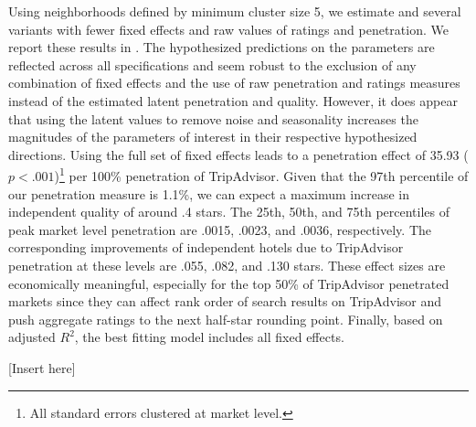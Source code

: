 \documentclass[12pt, leqno]{article}
\begin{document}
Using neighborhoods defined by minimum cluster size 5, we estimate  and several variants with fewer fixed effects and raw values of ratings and penetration. We report these results in . The hypothesized predictions on the parameters are reflected across all specifications and seem robust to the exclusion of any combination of fixed effects and the use of raw penetration and ratings measures instead of the estimated latent penetration and quality. However, it does appear that using the latent values to remove noise and seasonality increases the magnitudes of the parameters of interest in their respective hypothesized directions. Using the full set of fixed effects leads to a penetration effect of 35.93 ($p<.001$)\footnote{All standard errors clustered at market level.} per 100\% penetration of TripAdvisor. Given that the 97th percentile of our penetration measure is 1.1\%, we can expect a maximum increase in independent quality of around .4 stars. The 25th, 50th, and 75th percentiles of peak market level penetration are .0015, .0023, and .0036, respectively. The corresponding improvements of independent hotels due to TripAdvisor penetration at these levels are .055, .082, and .130 stars. These effect sizes are economically meaningful, especially for the top 50\% of TripAdvisor penetrated markets since they can affect rank order of search results on TripAdvisor and push aggregate ratings to the next half-star rounding point. Finally, based on adjusted $R^2$, the best fitting model includes all fixed effects.

[Insert  here]

\end{document}
